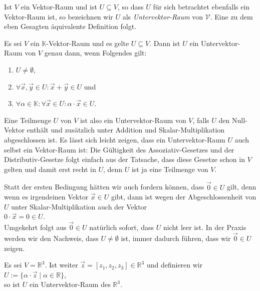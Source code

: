 Ist $V$ ein Vektor-Raum und ist $U \subseteq V$, so dass $U$ f\"{u}r sich betrachtet ebenfalls ein
Vektor-Raum ist, so bezeichnen wir $U$ als
\emph{\color{blue}Untervektor-Raum} von $\mathcal{V}$.  Eine zu dem eben Gesagten \"{a}quivalente Definition folgt.

\begin{Definition}
Es sei $V$ ein $\mathbb{K}$-Vektor-Raum und es gelte $U \subseteq V$.
Dann ist $U$ ein Untervektor-Raum von $V$ genau dann, 
wenn Folgendes gilt:
\begin{enumerate}
\item $U \not= \emptyset$,
\item $\forall \vec{x}, \vec{y} \in U: \vec{x} + \vec{y} \in U$ \quad und \quad
\item $\forall \alpha \in \mathbb{K}: \forall \vec{x} \in U: \alpha \cdot \vec{x} \in U$.  \eoxs
\end{enumerate}
\end{Definition}

Eine Teilmenge $U$ von $V$ ist also ein Untervektor-Raum von $V$, falls $U$ den Null-Vektor enth\"{a}lt und zus\"{a}tzlich
unter Addition und Skalar-Multiplikation abgeschlossen ist.  Es l\"{a}sst sich leicht zeigen, dass ein Untervektor-Raum $U$
auch selbst ein Vektor-Raum ist:  Die G\"{u}ltigkeit des Assoziativ-Gesetzes und der Distributiv-Gesetze folgt einfach aus
der Tatsache, dass diese Gesetze schon in $V$ gelten und damit erst recht in $U$, denn $U$ ist ja eine Teilmenge von
$V$. 

\remark
Statt der ersten Bedingung h\"{a}tten wir auch fordern k\"{o}nnen, dass $\vec{0} \in U$ gilt, denn wenn es
irgendeinen Vektor $\vec{x} \in U$ gibt,  dann ist wegen der Abgeschlossenheit von $U$ unter
Skalar-Multiplikation auch der Vektor
\\[0.2cm]
\hspace*{1.3cm}
$0 \cdot \vec{x} = 0 \in U$.  
\\[0.2cm]
Umgekehrt folgt aus $\vec{0} \in U$ nat\"{u}rlich sofort, dass $U$ nicht leer ist.  In der Praxis werden
wir den Nachweis, dass $U \not= \emptyset$ ist, immer dadurch f\"{u}hren, dass wir $\vec{0} \in U$
zeigen. 
\eoxs

\example
Es sei $V = \mathbb{R}^3$.  Ist weiter $\vec{z} = [ z_1, z_2, z_3 ] \in \mathbb{R}^3$ und definieren wir
\\[0.2cm]
\hspace*{1.3cm}
$U := \{ \alpha \cdot \vec{z} \mid \alpha \in \mathbb{R} \}$,
\\[0.2cm]
so ist $U$ ein Untervektor-Raum des $\mathbb{R}^3$.

